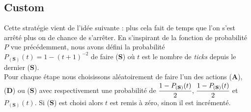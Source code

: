\subsection{Custom}
Cette stratégie vient de l'idée suivante : plus cela fait de temps que l'on s'est arrêté plus on de chance de s'arrêter.
En s'inspirant de la fonction de probabilité $P$ vue précédemment, nous avons
défini la probabilité $P_{(\textbf{S})}(t) = 1 - (t + 1)^{-2}$ de faire (\textbf{S}) où $t$ est le nombre de \emph{ticks} depuis
le dernier (\textbf{S}).\\
Pour chaque étape nous choisissons aléatoirement de faire l'un des actions  
(\textbf{A}), (\textbf{D}) ou (\textbf{S}) avec respectivement une probabilité
de $\cfrac{1 - P_{(\textbf{S})}(t)}{2}$, $\cfrac{1 - P_{(\textbf{S})}(t)}{2}$ et $P_{(\textbf{S})}(t)$. Si (\textbf{S}) est choisi
alors $t$ est remis à zéro, sinon il est incrémenté.